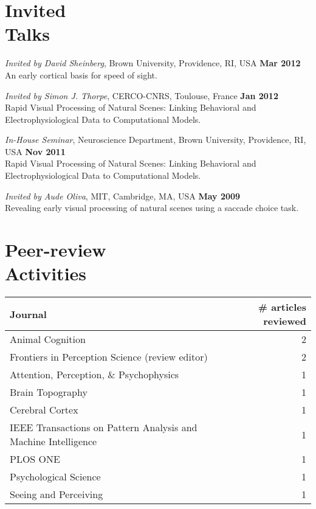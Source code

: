 \documentclass[margin,line]{resume}
\begin{document}
\begin{resume}
\normalsize


\newpage

    \section{\mysidestyle Invited\\Talks}
    
\footnotesize %

\textit{Invited by David Sheinberg}, Brown University, Providence, RI, USA \hfill \textbf{Mar 2012}\\
An early cortical basis for speed of sight. 

\vspace{-2mm} 
\textit{Invited by Simon J. Thorpe}, CERCO-CNRS, Toulouse, France \hfill \textbf{Jan 2012}\\
Rapid Visual Processing of Natural Scenes: Linking Behavioral and Electrophysiological Data to Computational Models.

\vspace{-2mm} 
\textit{In-House Seminar}, Neuroscience Department, Brown University, Providence, RI, USA \hfill \textbf{Nov 2011}\\
Rapid Visual Processing of Natural Scenes: Linking Behavioral and Electrophysiological Data to Computational Models.

\vspace{-2mm} 
\textit{Invited by Aude Oliva}, MIT, Cambridge, MA, USA \hfill \textbf{May 2009}\\
Revealing early visual processing of natural scenes using a saccade choice task.

\normalsize

\vspace{3mm}


   \section{\mysidestyle Peer-review\\Activities}

\vspace{3mm}
\begin{table}[ht]
\begin{tabular}{l r}
\textbf{Journal} & \textbf{\# articles reviewed} \\ \hline
Animal Cognition & 2\\
Frontiers in Perception Science (review editor) & 2\\
Attention, Perception, \& Psychophysics & 1\\
Brain Topography & 1\\
Cerebral Cortex & 1\\
IEEE Transactions on Pattern Analysis and Machine Intelligence & 1\\
PLOS ONE & 1\\
Psychological Science & 1\\
Seeing and Perceiving & 1\\
\end{tabular}
\end{table}



\end{resume}
\end{document}
